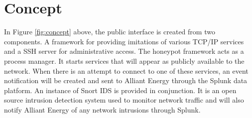 \section*{\color{NavyBlue}Concept}

\large

\begin{center}
{
\scalebox{1.65}{}
}
\label{fig:concept}

\end{center}
\vspace{2cm}

In Figure \ref{fig:concept} above, the public interface is created from two components.  A framework for providing imitations of various TCP/IP  services and a SSH server for administrative access. The honeypot framework acts as a process manager. It starts services that will appear as publicly available to the network. When there is an attempt to connect to one of these services, an event notification will be created and sent to Alliant Energy through the Splunk data platform. An instance of Snort IDS is provided in conjunction. It is an open source intrusion detection system used to monitor network traffic and will also notify Alliant Energy of any network intrusions through Splunk.